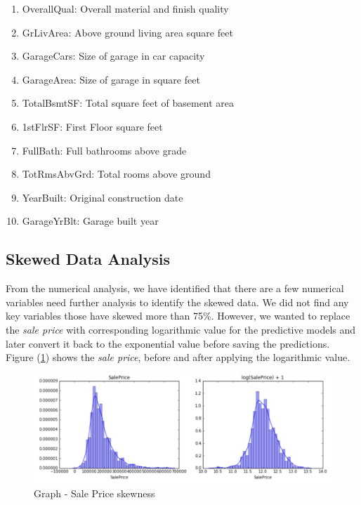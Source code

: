 \documentclass[sigconf]{acmart}
\begin{document}
	\begin{enumerate}
		\item OverallQual: Overall material and finish quality
		\item GrLivArea: Above ground living area square feet
		\item GarageCars: Size of garage in car capacity
		\item GarageArea: Size of garage in square feet
		\item TotalBsmtSF: Total square feet of basement area
		\item 1stFlrSF: First Floor square feet
		\item FullBath: Full bathrooms above grade
		\item TotRmsAbvGrd: Total rooms above ground
		\item YearBuilt: Original construction date
		\item GarageYrBlt: Garage built year		
	\end{enumerate}

	\subsection{Skewed Data Analysis}
	From the numerical analysis, we have identified that there are a few numerical variables need further analysis to identify the skewed data. We did not find any key variables those have skewed more than 75\%. However, we wanted to replace the {\em sale price} with corresponding logarithmic value for the predictive models and later convert it back to the exponential value before saving the predictions. Figure (\ref{fig:sale-price-skew}) shows the {\em sale price}, before and after applying the logarithmic value. 
	
	\begin{figure}[htb]
		\centering
		\includegraphics[width=1.0\columnwidth]{images/sale_price_skew}	
		\caption{Graph - Sale Price skewness} \label{fig:sale-price-skew} 
	\end{figure}
\end{document}
